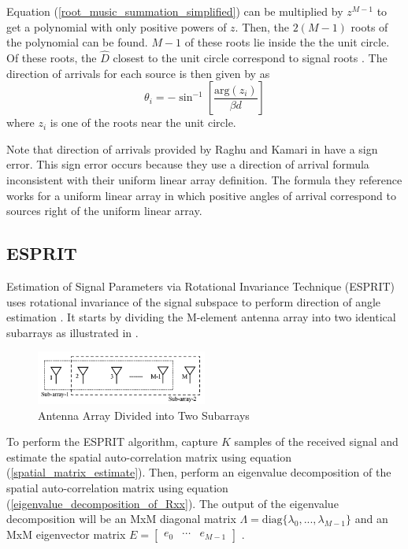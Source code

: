 \documentclass[conference]{IEEEtran}
\begin{document}
		Equation (\ref{root_music_summation_simplified}) can be multiplied by $z^{M-1}$ to get a polynomial with only positive powers of $z$. Then, the $2(M-1)$ roots of the polynomial can be found. $M - 1$ of these roots lie inside the the unit circle. Of these roots, the $\hat{D}$ closest to the unit circle correspond to signal roots \cite{root_music_eskandari}. The direction of arrivals for each source is then given by \cite{root_music_esprit_patwari} as 
		\begin{equation}
			\theta_i = -\sin^{-1}\left[\frac{\text{arg}(z_i)}{{\beta}d}\right]
		\end{equation}
		where $z_i$ is one of the roots near the unit circle.
		
			Note that direction of arrivals provided by Raghu and Kamari in \cite{doa_algorithms_raghu} have a sign error. This sign error occurs because they use a direction of arrival formula inconsistent with their uniform linear array definition. The formula they reference works for a uniform linear array in which positive angles of arrival correspond to sources right of the uniform linear array.
		
	\subsection{ESPRIT}
		
		Estimation of Signal Parameters via Rotational Invariance Technique (ESPRIT) uses rotational invariance of the signal subspace to perform direction of angle estimation \cite{root_music_ko}. It starts by dividing the M-element antenna array into two identical subarrays as illustrated in \cite{doa_algorithms_raghu}.
		
		\begin{figure}[H]
			\centerline{\includegraphics[width=0.5\textwidth]{esprit_doublets.png}}
			\caption{Antenna Array Divided into Two Subarrays \cite{doa_algorithms_raghu}}
			\label{fig::esprit_subarrays}
		\end{figure}
		
		To perform the ESPRIT algorithm, capture $K$ samples of the received signal and estimate the spatial auto-correlation matrix using equation (\ref{spatial_matrix_estimate}). Then, perform an eigenvalue decomposition of the spatial auto-correlation matrix using equation (\ref{eigenvalue_decomposition_of_Rxx}). The output of the eigenvalue decomposition will be an MxM diagonal matrix $\Lambda = \text{diag}\{\lambda_0, ..., \lambda_{M-1}\}$ and an MxM eigenvector matrix $E = \begin{bmatrix}e_0 & \cdots & e_{M-1}\end{bmatrix}$ \cite{doa_algorithms_raghu}. 
		
\end{document}
